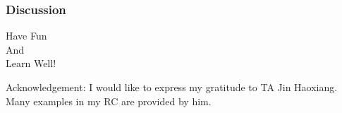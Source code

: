 \documentclass[12pt, t]{beamer}
\begin{document}
\begin{frame}
    \frametitle{Discussion}
    \vspace{1cm}
    \begin{center}
        \LARGE
        Have Fun\\
        And\\
        Learn Well!
    \end{center}
    \vspace{2cm}
    \footnotesize Acknowledgement: I would like to express my gratitude to TA Jin Haoxiang. Many examples in my RC are provided by him.
\end{frame}
\end{document}
